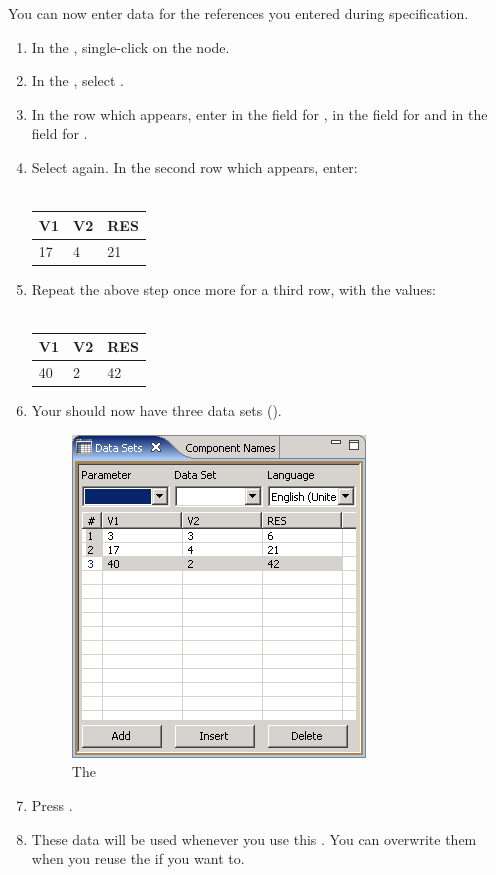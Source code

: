 You can now enter data for the references you entered during specification.

\begin{enumerate}
\item In the \gdtestcaseeditor{}, single-click on the  node. 
\item In the \gddatasetsview{}, select . 
\item In the row which appears, enter  in the  field for 
,  in the field for  and 
in the field for .  
\item Select   again. In the second row which appears, enter:
\\
\\
\begin{tabular}{|p{0.2\bxpicwidth}|p{0.2\bxpicwidth}|p{0.2\bxpicwidth}|}\hline
 \textbf{V1}& \textbf{V2}& \textbf{RES} \\ \hline
 17& 4& 21 \\ \hline
\end{tabular}

\item Repeat the above step once more for a third row, with the values:
\\
\\
\begin{tabular}{|p{0.2\bxpicwidth}|p{0.2\bxpicwidth}|p{0.2\bxpicwidth}|}\hline
 \textbf{V1}& \textbf{V2}& \textbf{RES} \\ \hline
 40& 2& 42 \\ \hline
\end{tabular}
\item Your \gddatasetsview{} should now have three data sets ().
\begin{figure}[h]
\begin{center}
\includegraphics{Tutorials/PS/TutDataSets}
\caption{The \gddatasetsview{}}
\label{TutDataSets}
\end{center}
\end{figure}

\item Press .
\item These data will be used whenever you use this \gdcase{}. You can overwrite them when you reuse the \gdcase{} if you want to.  
\end{enumerate}
